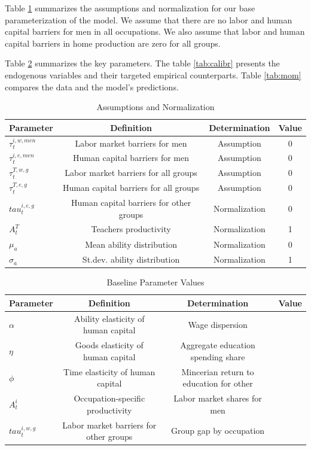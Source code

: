 \documentclass[onehalfspacing,11pt]{article}
\begin{document}
Table \ref{tab:assump} summarizes the assumptions and normalization for our base parameterization of the model. We assume that there are no labor and human capital barriers for men in all occupations. We also assume that labor and human capital barriers in home production are zero for all groups.

Table \ref{tab:param} summarizes the key parameters. The table \ref{tab:calibr} presents the endogenous variables and their targeted empirical counterparts. Table \ref{tab:mom} compares the data and the model's predictions.

	\begin{table}[h!]
		\centering
		\begin{tabular}{lccc}
			\toprule
			\toprule
			Parameter & Definition & Determination & Value\\
			\midrule
			$\tau^{i,w,men}_t$ & Labor market barriers for men & Assumption & 0\\
			$\tau^{i,e,men}_t$ & Human capital barriers for men & Assumption & 0\\
			$\tau^{T,w,g}_t$ & Labor market barriers for all groups & Assumption & 0\\
			$\tau^{T,e,g}_t$ & Human capital barriers for all groups & Assumption & 0\\
			$tau^{i,e,g}_t$ & Human capital barriers for other groups & Normalization & 0\\
			$A^{T}_t$ & Teachers productivity & Normalization & 1\\
			$\mu_a$ & Mean ability distribution & Normalization & 0\\
			$\sigma_a$ & St.dev. ability distribution & Normalization & 1\\
			\bottomrule
		\end{tabular}
		\caption{Assumptions and Normalization}
		\label{tab:assump}
	\end{table}
	
	\begin{table}[h!]
		\centering
		\begin{tabular}{lccc}
			\toprule
			\toprule
			Parameter & Definition & Determination & Value\\
			\midrule
			$\alpha$ & Ability elasticity of human capital & Wage dispersion &\\
			$\eta$ & Goods elasticity of human capital & Aggregate education spending share & \\
			$\phi$ & Time elasticity of human capital & Mincerian return to education for other \\
			$A^{i}_t$ & Occupation-specific productivity & Labor market shares for men\\
			$tau^{i,w,g}_t$ & Labor market barriers for other groups & Group gap by occupation\\
			\bottomrule
		\end{tabular}
		\caption{Baseline Parameter Values}
		\label{tab:param}
	\end{table}
	
\end{document}
